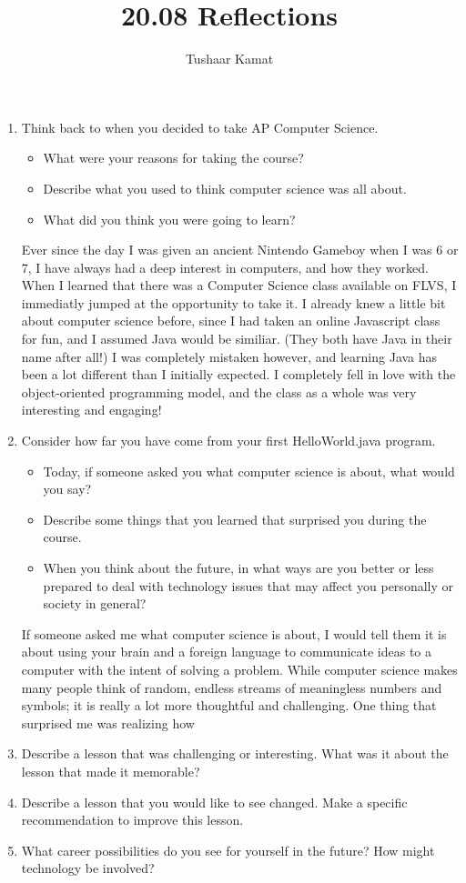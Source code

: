 \documentclass[12pt]{article}
\author{Tushaar Kamat}
\title{20.08 Reflections}
\begin{document}
\maketitle

\begin{enumerate}
\item Think back to when you decided to take AP Computer Science.
  \begin{itemize}
  \item What were your reasons for taking the course?
  \item Describe what you used to think computer science was all about.
  \item What did you think you were going to learn?
  \end{itemize}

  Ever since the day I was given an ancient Nintendo Gameboy when I was 6 or 7,
  I have always had a deep interest in computers, and how they worked. When I
  learned that there was a Computer Science class available on FLVS, I
  immediatly jumped at the opportunity to take it. I already knew a little bit
  about computer science before, since I had taken an online Javascript class
  for fun, and I assumed Java would be similiar. (They both have Java in their
  name after all!) I was completely mistaken however, and learning Java has been
  a lot different than I initially expected. I completely fell in love with the
  object-oriented programming model, and the class as a whole was very
  interesting and engaging! 

\item Consider how far you have come from your first HelloWorld.java program.
  \begin{itemize}
  \item Today, if someone asked you what computer science is about, what would you
  say?
  \item Describe some things that you learned that surprised you during the
  course.
  \item When you think about the future, in what ways are you better or less
  prepared to deal with technology issues that may affect you personally or
  society in general?
\end{itemize}

  If someone asked me what computer science is about, I would tell them it is
  about using your brain and a foreign language to communicate ideas to a computer
  with the intent of solving a problem. While computer science makes many people
  think of random, endless streams of meaningless numbers and symbols; it is
  really a lot more thoughtful and challenging. One thing that surprised me was
  realizing how 

\item Describe a lesson that was challenging or interesting. What was it about
  the lesson that made it memorable?

\item Describe a lesson that you would like to see changed. Make a specific
  recommendation to improve this lesson.

\item What career possibilities do you see for yourself in the future? How might
  technology be involved?
\end{enumerate}
\end{document}
